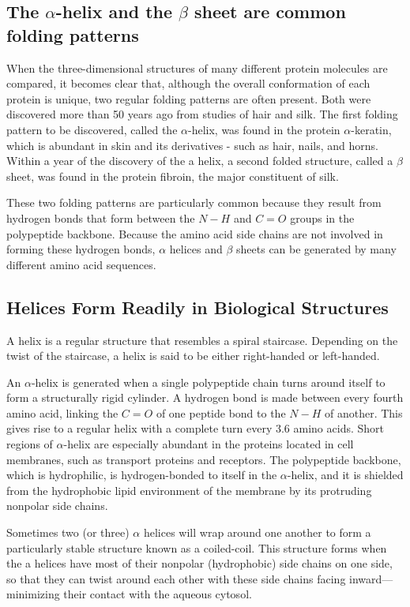 \subsection{The $\alpha$-helix and the $\beta$ sheet are common folding patterns}

When the three-dimensional structures of many different protein molecules 
are compared, it becomes clear that, although the overall
conformation of each protein is unique, two regular folding patterns are
often present. Both were discovered more than 50 years ago from studies 
of hair and silk. The first folding pattern to be discovered, called the
$\alpha$-helix, was found in the protein $\alpha$-keratin, which is abundant in skin and
its derivatives - such as hair, nails, and horns. Within a year of the discovery 
of the a helix, a second folded structure, called a $\beta$ sheet, was found
in the protein fibroin, the major constituent of silk.

These two folding patterns are particularly common because they result
from hydrogen bonds that form between the $N-H$ and $C=O$ groups in
the polypeptide backbone. Because the amino acid side chains are not
involved in forming these hydrogen bonds, $\alpha$ helices and $\beta$ sheets can
be generated by many different amino acid sequences.

\subsection{Helices Form Readily in Biological Structures}

A helix is a regular structure that resembles a spiral staircase.
Depending on the twist of the staircase, a helix is said to be either 
right-handed or left-handed.

An $\alpha$-helix is generated when a single polypeptide chain turns around
itself to form a structurally rigid cylinder. A hydrogen bond is made
between every fourth amino acid, linking the $C=O$ of one peptide bond to
the $N-H$ of another. This gives rise to a regular helix
with a complete turn every 3.6 amino acids.
Short regions of $\alpha$-helix are especially abundant in the proteins located
in cell membranes, such as transport proteins and receptors.
The polypeptide backbone, which is hydrophilic, is hydrogen-bonded to itself in 
the $\alpha$-helix, and it is shielded
from the hydrophobic lipid environment of the membrane by its protruding nonpolar side chains.

Sometimes two (or three) $\alpha$ helices will wrap around one another to
form a particularly stable structure known as a coiled-coil. This structure 
forms when the a helices have most of their nonpolar (hydrophobic)
side chains on one side, so that they can twist around each other with
these side chains facing inward—minimizing their contact with the aqueous cytosol.

